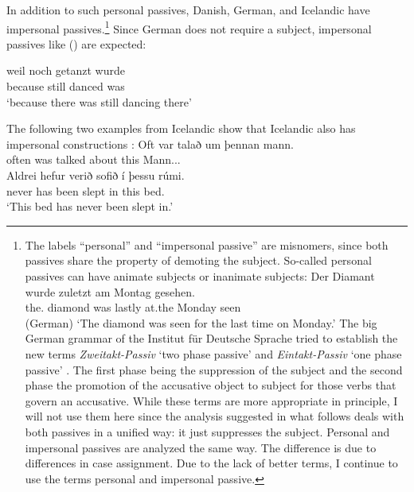 In addition to such personal passives, Danish, German, and Icelandic have impersonal
passives.\footnote{
The labels ``personal'' and ``impersonal passive'' are misnomers, since both passives share the property of
demoting the subject. So-called personal passives can have animate subjects or inanimate subjects:
\ea 
\gll Der Diamant wurde zuletzt am Montag gesehen.\\
     the.\NOM{} diamond was   lastly at.the Monday seen\\\hfill(German)
\glt `The diamond was seen for the last time on Monday.'
\z
The big German grammar of the Institut für Deutsche Sprache tried to establish the new terms \emph{Zweitakt-Passiv} `two phase passive' and
\emph{Eintakt-Passiv} `one phase passive' \citep[]{Zifonun97b}. The first phase being the suppression of the subject and
the second phase the promotion of the accusative object to subject for those verbs that govern an
accusative. While these terms are more appropriate in principle, I will not use them here since the
analysis suggested in what follows deals with both passives in a unified way: it just suppresses the
subject. Personal and impersonal passives are analyzed the same way. The difference is due to
differences in case assignment. Due to the lack of better terms, I continue to use the terms personal and
impersonal passive.
} Since German does not require a subject, impersonal passives like () are expected:

\ea
\gll weil noch getanzt wurde\\
     because still danced was\\\german
\glt `because there was still dancing there'
\z

The following two examples from Icelandic show that Icelandic also has impersonal constructions \citep[]{Thrainsson2007a-u}:
\eal
\ex 
\gll Oft var   talað      um   þennan mann.\\
     often was talked about this Mann.\ACC.\SG.\M\\\icelandic
\ex
\gll Aldrei hefur verið    sofið      í  þessu  rúmi.\\
     never    has   been slept in this bed.\DAT\\
\glt `This bed has never been slept in.'
\zl

